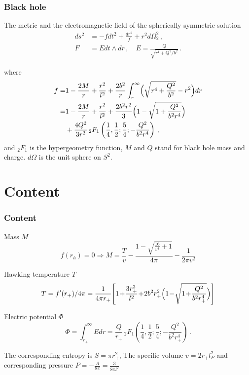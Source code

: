 \documentclass[aspectratio=43, 9pt, utf8, mathserif]{beamer}
\begin{document}
\begin{frame}
\frametitle{\textbf{Black hole}}
\begin{exampleblock}{The metric and the electromagnetic field of the spherically symmetric solution}
\begin{align}
    ds^2&=-fdt^2+\frac{dr^2}{f}+r^2 d\Omega_2^2\,,\label{BImetric}\\
    F&=Edt\wedge dr\label{BIE}\,, \quad E=\frac{Q}{\sqrt{r^4+Q^2/b^2}}\,.
\end{align}
\end{exampleblock}
where
\begin{equation}
\begin{split}
    f=&1-\frac{2M}{r}+\frac{r^2}{l^2}+\frac{2b^2}{r}\int_r^\infty \Bigl(\sqrt{r^4+\frac{Q^2}{b^2}}-r^2\Bigr)dr\nonumber\\
    =&1-\frac{2M}{r}+\frac{r^2}{l^2}+\frac{2b^2 r^2}{3}\Bigl(1-\sqrt{1+\frac{Q^2}{b^2 r^4}}\Bigr)\nonumber\\
    &+\frac{4Q^2}{3r^2}\,{}_2 F_1\left(\frac{1}{4},\frac{1}{2}; \frac{5}{4};-\frac{Q^2}{b^2 r^4}\right)\,,
\end{split}
\end{equation}
and $_2 F_1$ is the hypergeometry function, $M$ and $Q$ stand for black hole mass and charge. $d\Omega$ is the unit sphere on $S^2$.
\end{frame}

\section{Content}\label{sec:content}
\begin{frame}
\frametitle{\textbf{Content}}
\begin{block}{Mass $M$}
\begin{equation}
    f(r_h) = 0 \Longrightarrow M = \frac{T}{v}-\frac{1-\sqrt{\frac{16}{v^4}+1}}{4 \pi }-\frac{1}{2 \pi  v^2}
\end{equation}
\end{block}
    
\begin{exampleblock}{Hawking temperature $T$}
\begin{equation}\label{eq:T}
    T = f^{\prime}(r_+) / 4 \pi = \frac{1}{4\pi r_+}\!\left[1\!+\!\frac{3r_+^2}{l^2}\!+\!2b^2 r_+^2\Bigl(1\!-\!\sqrt{1\!+\!\frac{Q^2}{b^2 r_+^4}}\Bigr)\right]
\end{equation}
\end{exampleblock}
    
\begin{alertblock}{Electric potential $\Phi$}
\begin{equation}
    \Phi=\int_{r_+}^\infty E dr
    =\frac{Q}{r_+}\,{}_2 F_1\!\left(\frac{1}{4},\frac{1}{2};\frac{5}{4};-\frac{Q^2}{b^2 r_+^4}\right)\,.
\end{equation}
\end{alertblock}
    
The corresponding entropy is $S = \pi r_+^2$, The specific volume $v = 2 r_+ l_P^2$ and corresponding pressure $P = - \frac{\Lambda}{8 \pi} = \frac{3}{8 \pi l^2}$
\end{frame}
\end{document}
